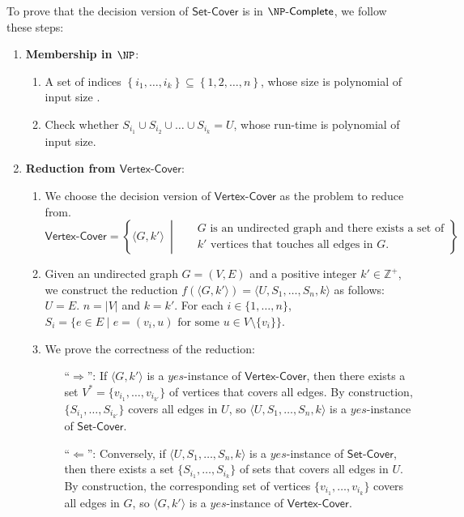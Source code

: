 To prove that the decision version of $\mathsf{Set\text{-}Cover}$ is in $\complete{\NP}$, we follow these steps:
 
\begin{enumerate}
    \item \textbf{Membership in $\NP$}:
        \begin{enumerate}
        \item A set of indices $\left\{i_1, \dots, i_k\right\} \subseteq \left\{1, 2, \dots, n\right\}$, whose size is polynomial of input size .
        \item Check whether $S_{i_1} \cup S_{i_2} \cup \dots \cup S_{i_k} = U$, whose run-time is polynomial of input size.
        \end{enumerate}
    \item \textbf{Reduction from $\mathsf{Vertex\text{-}Cover}$}:
        \begin{enumerate}
            \item We choose the decision version of $\mathsf{Vertex\text{-}Cover}$ as the problem to reduce from.
            \begin{equation*}
            \mathsf{Vertex\text{-}Cover} = \left\{\langle{G,k'\rangle}~\middle|~~~
            \begin{aligned}
                &\text{$G$ is an undirected graph and there exists a set of} \\&\text{$k'$ vertices that touches all edges in $G$.}
            \end{aligned}\right\}
            \end{equation*}
            \item Given an undirected graph $G = (V, E)$ and a positive integer $k' \in \mathbb{Z}^+$, we construct the reduction $f(\langle G, k' \rangle) = \langle U, S_1, \ldots, S_n, k \rangle$ as follows: $U = E$. $n = |V|$ and $k = k'$. For each $i \in \{1, \ldots, n\}$, $S_i = \{e \in E \mid e = (v_i, u) \text{ for some } u \in V \setminus \{v_i\}\}$.
            \item We prove the correctness of the reduction:
                \begin{enumerate}
                    \item[``$\Rightarrow$'':] If $\langle G, k' \rangle$ is a $yes$-instance of $\mathsf{Vertex\text{-}Cover}$, then there exists a set $V^* = \{v_{i_1}, \ldots, v_{i_{k'}}\}$ of vertices that covers all edges. By construction, $\{S_{i_1}, \ldots, S_{i_{k'}}\}$ covers all edges in $U$, so $\langle U, S_1, \ldots, S_n, k \rangle$ is a $yes$-instance of $\mathsf{Set\text{-}Cover}$.
                    \item[``$\Leftarrow$'':] Conversely, if $\langle U, S_1, \ldots, S_n, k \rangle$ is a $yes$-instance of $\mathsf{Set\text{-}Cover}$, then there exists a set $\{S_{i_1}, \ldots, S_{i_k}\}$ of sets that covers all edges in $U$. By construction, the corresponding set of vertices $\{v_{i_1}, \ldots, v_{i_k}\}$ covers all edges in $G$, so $\langle G, k' \rangle$ is a $yes$-instance of $\mathsf{Vertex\text{-}Cover}$.
                \end{enumerate}
        \end{enumerate}
\end{enumerate}
 
